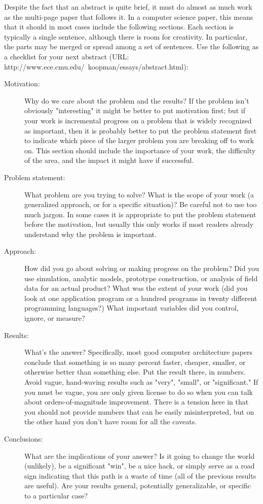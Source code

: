 

Despite the fact that an abstract is quite brief, it must do almost as much work as the multi-page
paper that follows it. In a computer science paper, this means that it should in most cases include
the following sections. Each section is typically a single sentence, although there is room for
creativity. In particular, the parts may be merged or spread among a set of sentences. Use the
following as a checklist for your next abstract (URL:
http://www.ece.cmu.edu/~koopman/essays/abstract.html):

\begin{description}
  \item[Motivation:] Why do we care about the problem and the results? If the problem isn't obviously
"interesting" it might be better to put motivation first; but if your work is incremental progress
on a problem that is widely recognized as important, then it is probably better to put the problem
statement first to indicate which piece of the larger problem you are breaking off to work on. This
section should include the importance of your work, the difficulty of the area, and the impact it
might have if successful.
  \item[Problem statement:]  What problem are you trying to solve? What is the
scope of your work (a generalized approach, or for a specific situation)? Be careful not to use too
much jargon. In some cases it is appropriate to put the problem statement before the motivation,
but usually this only works if most readers already understand why the problem is important.
  \item[Approach:] How did you go about solving or making progress on the problem? Did you use simulation,
analytic models, prototype construction, or analysis of field data for an actual product? What was
the extent of your work (did you look at one application program or a hundred programs in twenty
different programming languages?) What important variables did you control, ignore, or measure?
  \item[Results:] What's the answer? Specifically, most good computer architecture papers conclude that
something is so many percent faster, cheaper, smaller, or otherwise better than something else. Put
the result there, in numbers. Avoid vague, hand-waving results such as "very", "small", or
"significant." If you must be vague, you are only given license to do so when you can talk about
orders-of-magnitude improvement. There is a tension here in that you should not provide numbers
that can be easily misinterpreted, but on the other hand you don't have room for all the caveats.
  \item[Conclusions:] What are the implications of your answer? Is it going to change the world (unlikely),
be a significant "win", be a nice hack, or simply serve as a road sign indicating that this path is
a waste of time (all of the previous results are useful). Are your results general, potentially
generalizable, or specific to a particular case?

\end{description}




\smallskip


